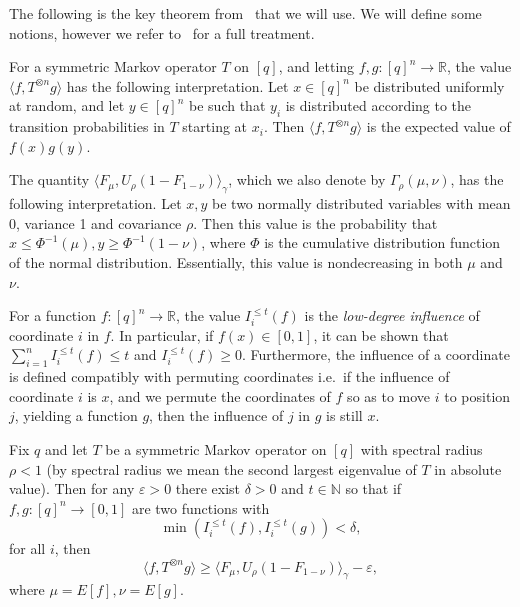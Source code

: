 \documentclass[a4paper,11pt, DIV=11]{scrartcl}
\renewcommand{\epsilon}{\varepsilon}
\theoremstyle{plain}
\theoremstyle{definition}
\begin{document}
The following is the key theorem from~\cite{Dinur09:sicomp} that we will use. We will define some notions, however we refer to~\cite{Dinur09:sicomp} for a full treatment.

\begin{definition}
    For a symmetric Markov operator $T$ on $[q]$, and letting $f, g : [q]^n \to \mathbb{R}$, the value $\langle f, T^{\otimes n} g \rangle$ has the following interpretation. Let $x \in [q]^n$ be distributed uniformly at random, and let $y \in [q]^n$ be such that $y_i$ is distributed according to the transition probabilities in $T$ starting at $x_i$. Then $\langle f, T^{\otimes n} g \rangle$ is the expected value of $f(x) g(y)$.

    The quantity $\langle F_\mu, U_\rho(1 - F_{1 - \nu})\rangle_\gamma$, which we also denote by $\Gamma_\rho(\mu, \nu)$, has the following interpretation. Let $x, y$ be two normally distributed variables with mean 0, variance 1 and covariance $\rho$. Then this value is the probability that $x \leq \Phi^{-1}(\mu), y \geq \Phi^{-1}(1 - \nu)$, where $\Phi$ is the cumulative distribution function of the normal distribution. Essentially, this value is nondecreasing in both $\mu$ and $\nu$.

    For a function $f : [q]^n \to \mathbb{R}$, the value $I_i^{\leq t}(f)$ is the \emph{low-degree influence} of coordinate $i$ in $f$. In particular, if $f(x) \in [0, 1]$, it can be shown that $\sum_{i = 1}^n I_i^{\leq t}(f) \leq t$ and $I_i^{\leq t}(f) \geq 0$. Furthermore, the influence of a coordinate is defined compatibly with permuting coordinates i.e.~if the influence of coordinate $i$ is $x$, and we permute the coordinates of $f$ so as to move $i$ to position $j$, yielding a function $g$, then the influence of $j$ in $g$ is still $x$.
\end{definition}

\begin{theorem}\label{thm:dinur_thm}
    Fix $q$ and let $T$ be a symmetric Markov operator on $[q]$ with spectral radius $\rho < 1$ (by spectral radius we mean the second largest eigenvalue of $T$ in absolute value). Then for any $\epsilon > 0$ there exist $\delta > 0$ and $t \in \mathbb{N}$ so that if $f, g : [q]^n \to [0, 1]$ are two functions with
    \[
    \min(I_i^{\leq t}(f), I_i^{\leq t}(g)) < \delta,
    \]
    for all $i$, then
    \[
    \langle f, T^{\otimes n} g\rangle \geq \langle F_\mu, U_\rho (1 - F_{1 - \nu})\rangle_\gamma - 
    \epsilon,
    \]
    where $\mu = E[f], \nu = E[g]$.
\end{theorem}
\end{document}
